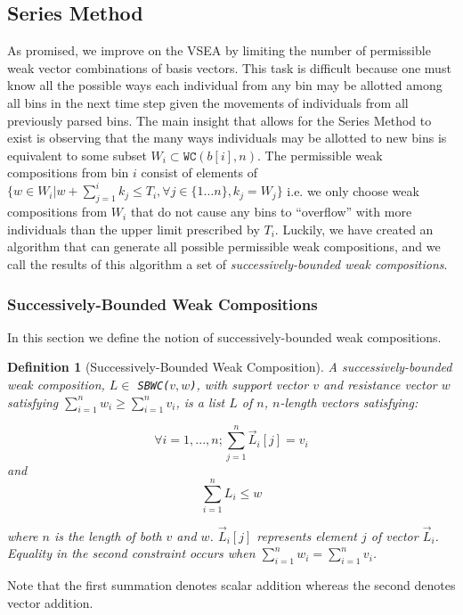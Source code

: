 \documentclass{article}
\newtheorem{defn}{Definition}
\begin{document}
\subsection{Series Method}
As promised, we improve on the VSEA by limiting the number of permissible weak vector combinations of basis vectors. This task is difficult because one must know all the possible ways each individual from any bin may be allotted among all bins in the next time step given the movements of individuals from all previously parsed bins. The main insight that allows for the Series Method to exist is observing that the many ways individuals may be allotted to new bins is equivalent to some subset $W_i \subset \texttt{WC}(b[i],n)$. The permissible weak compositions from bin $i$ consist of elements of $\{w \in W_i | w+\sum^i_{j=1} k_j \leq T_i, \forall j \in \{1 \dots n\}, k_j = W_j\}$ i.e. we only choose weak compositions from $W_i$ that do not cause any bins to ``overflow'' with more individuals than the upper limit prescribed by $T_i$. Luckily, we have created an algorithm that can generate all possible permissible weak compositions, and we call the results of this algorithm a set of \textit{successively-bounded weak compositions}.

\subsubsection{Successively-Bounded Weak Compositions}
In this section we define the notion of successively-bounded weak compositions.

\begin{defn}[Successively-Bounded Weak Composition]
    A successively-bounded weak composition, $L \in$ \textnormal{\texttt{SBWC($v, w$)}}, with support vector $v$ and resistance vector $w$ satisfying $\sum^n_{i=1} w_i \geq \sum^n_{i=1} v_i$, is a list $L$ of $n$, $n$-length vectors satisfying:

    \[
        \forall i=1,...,n; \sum^n_{j=1} \vec{L}_i[j] = v_i
    \]
    \hspace{5cm} and
    \[
        \sum^n_{i=1} L_i \leq w
    \]

    where $n$ is the length of both $v$ and $w$. $\vec{L}_i[j]$ represents element $j$ of vector $\vec{L}_i$. Equality in the second constraint occurs when $\sum^n_{i=1} w_i = \sum^n_{i=1} v_i$.
\end{defn}

Note that the first summation denotes scalar addition whereas the second denotes vector addition.
\end{document}
